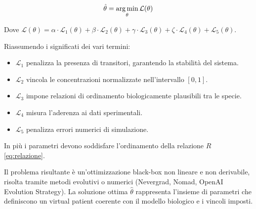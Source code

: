 \begin{equation}
    \hat{\theta} = \operatorname*{arg\,min}_{\theta} \mathcal{L}(\theta)
\end{equation}

Dove $\mathcal{L}(\theta) = \alpha \cdot \mathcal{L}_1(\theta) + \beta \cdot \mathcal{L}_2(\theta) + \gamma \cdot \mathcal{L}_3(\theta) + \zeta \cdot \mathcal{L}_4(\theta) + \mathcal{L}_5(\theta)$.

Riassumendo i significati dei vari termini:

\begin{itemize}
    \item $\mathcal{L}_1$ penalizza la presenza di transitori, garantendo la stabilità del sistema.
    \item $\mathcal{L}_2$ vincola le concentrazioni normalizzate nell'intervallo $[0, 1]$.
    \item $\mathcal{L}_3$ impone relazioni di ordinamento biologicamente plausibili tra le specie.
    \item $\mathcal{L}_4$ misura l'aderenza ai dati sperimentali.
    \item $\mathcal{L}_5$ penalizza errori numerici di simulazione.
\end{itemize}

In più i parametri devono soddisfare l'ordinamento della relazione $R$ \eqref{eq:relazione}.

Il problema risultante è un'ottimizzazione black-box non lineare e non derivabile, risolta tramite metodi evolutivi o numerici (Nevergrad, Nomad, OpenAI Evolution Strategy).
La soluzione ottima \(\hat{\theta}\) rappresenta l'insieme di parametri che definiscono un virtual patient coerente con il modello biologico e i vincoli imposti.
